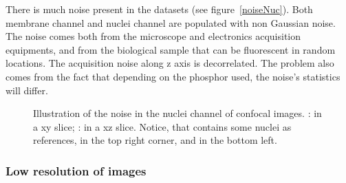 There is much noise present in the datasets (see figure~\ref{noiseNuc}). Both membrane channel and nuclei channel are populated with non Gaussian noise.
The noise comes both from the microscope and electronics acquisition equipments, and from the biological sample that can be fluorescent in random locations.
The acquisition noise along z axis is decorrelated.
The problem also comes from the fact that depending on the phosphor used, the noise's statistics will differ.
\begin{figure}[htb]
\centering
   \hspace{5pt}
  \caption{%
    Illustration of the noise in the nuclei channel of confocal images.
    : in a xy slice;
    : in a xz slice. 
    Notice, that  contains some nuclei as references, in the top right corner, and  in the bottom left.}
\label{fig:noiseNuc}
\end{figure}


\subsubsection{Low resolution of images}

